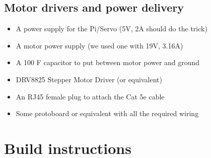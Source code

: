 \documentclass[12pt]{article}
\begin{document}
\subsection*{Motor drivers and power delivery}
\begin{itemize}
  \item A power supply for the Pi/Servo (5V, 2A should do the trick)
  \item A motor power supply (we used one with 19V, 3.16A)
  \item A 100 \textmu F capacitor to put between motor power and ground
  \item DRV8825 Stepper Motor Driver (or equivalent)
  \item An RJ45 female plug to attach the Cat 5e cable
  \item Some protoboard or equivalent with all the required wiring
\end{itemize}


\section{Build instructions}
\label{sec:buildinst}
\end{document}
